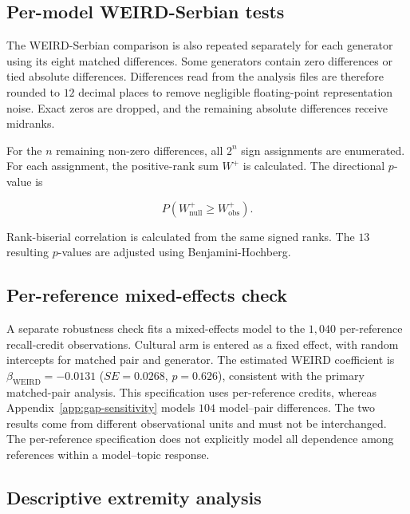 \documentclass[11pt,a4paper]{article}
\begin{document}
\subsection{Per-model WEIRD-Serbian tests}
\label{app:per_model_tests}

The WEIRD-Serbian comparison is also repeated separately for each generator using its eight matched differences. Some generators contain zero differences or tied absolute differences. Differences read from the analysis files are therefore rounded to $12$ decimal places to remove negligible floating-point representation noise. Exact zeros are dropped, and the remaining absolute differences receive midranks.

For the $n$ remaining non-zero differences, all $2^n$ sign assignments are enumerated. For each assignment, the positive-rank sum $W^+$ is calculated. The directional $p$-value is

\begin{equation}
 P\left(W^+_{\mathrm{null}}\geq W^+_{\mathrm{obs}}\right).
\end{equation}

Rank-biserial correlation is calculated from the same signed ranks. The $13$ resulting $p$-values are adjusted using Benjamini-Hochberg.

\subsection{Per-reference mixed-effects check}
\label{app:mixed_model}

A separate robustness check fits a mixed-effects model to the $1,040$ per-reference recall-credit observations. Cultural arm is entered as a fixed effect, with random intercepts for matched pair and generator. The estimated WEIRD coefficient is $\beta_{\mathrm{WEIRD}}=-0.0131$ ($SE=0.0268$, $p=0.626$), consistent with the primary matched-pair analysis. This specification uses per-reference credits, whereas Appendix~\ref{app:gap-sensitivity} models $104$ model--pair differences. The two results come from different observational units and must not be interchanged. The per-reference specification does not explicitly model all dependence among references within a model--topic response.

\subsection{Descriptive extremity analysis}
\label{app:extremity}
\end{document}
